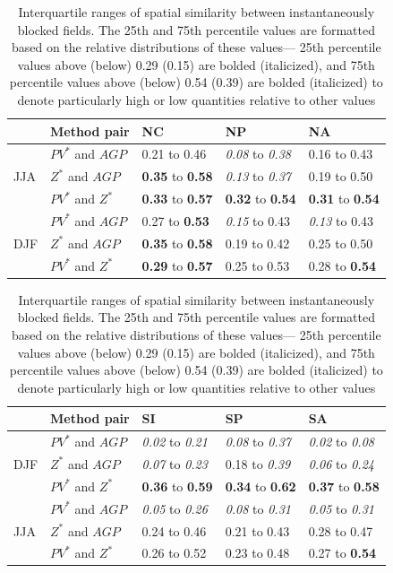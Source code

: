 \documentclass[smallextended]{svjour3}       %
\numberwithin{equation}{section}
\begin{document}
\begin{table}
\centering

\caption{ Interquartile ranges of spatial similarity between instantaneously blocked fields. {\color{blue}The 25th and 75th percentile values are formatted based on the relative distributions of these values--- 25th percentile values above (below) 0.29 (0.15) are bolded (italicized), and 75th percentile values above (below) 0.54 (0.39) are bolded (italicized) to denote particularly high or low quantities relative to other values}}
\label{simtabcol}
\begin{tabular}{|l|l|l|l|l|}
\hline
  & Method pair & NC    & NP    & NA    \\ \hline
\multirow{3}{*}{JJA} 
   & $PV^* $ and $AGP$    & {0.21} to {0.46} & \textit{0.08} to \textit{0.38} & {0.16} to {0.43}  \\  
   & $Z^*$ and $AGP$   & \textbf{0.35} to \textbf{0.58} & \textit{0.13} to \textit{0.37} & {0.19} to {0.50}  \\   
   & $PV^*$ and $Z^*$   & \textbf{0.33} to \textbf{0.57} & \textbf{0.32} to \textbf{0.54} & \textbf{0.31} to \textbf{0.54}  \\ 
   \hline
\multirow{3}{*}{DJF}
  & $PV^*$ and $AGP$ & {0.27} to \textbf{0.53} & \textit{0.15} to {0.43} & \textit{0.13} to {0.43} \\   
  & $Z^*$ and $AGP$ & \textbf{0.35} to \textbf{0.58} & {0.19} to {0.42} & 0.25 to {0.50} \\ 
  & $PV^*$ and $Z^*$   & \textbf{0.29} to \textbf{0.57} & {0.25} to {0.53} & {0.28} to \textbf{0.54} \\  
  \hline
\end{tabular}
\begin{tabular}{|l|l|l|l|l|}
\hline
  & Method pair & SI    & SP    & SA      \\ \hline

\multirow{3}{*}{DJF}
  & $PV^*$ and $AGP$  & \textit{0.02} to \textit{0.21} & \textit{0.08} to \textit{0.37} & \textit{0.02} to \textit{0.08} \\   
  & $Z^*$ and $AGP$ & \textit{0.07} to \textit{0.23} & {0.18} to \textit{0.39} & \textit{0.06} to \textit{0.24} \\ 
  & $PV^*$ and $Z^*$  & \textbf{0.36} to \textbf{0.59} & \textbf{0.34} to \textbf{0.62} & \textbf{0.37} to \textbf{0.58} \\  
  \hline
  \multirow{3}{*}{JJA} 
   & $PV^* $ and $AGP$    & \textit{0.05} to \textit{0.26} & \textit{0.08} to \textit{0.31} & \textit{0.05} to \textit{0.31} \\  
   & $Z^*$ and $AGP$   & {0.24} to {0.46} & {0.21} to {0.43} & {0.28} to {0.47} \\   
   & $PV^*$ and $Z^*$   & {0.26} to {0.52} & {0.23} to {0.48} & {0.27} to \textbf{0.54} \\ 
  \hline
\end{tabular}

\end{table}
\end{document}
